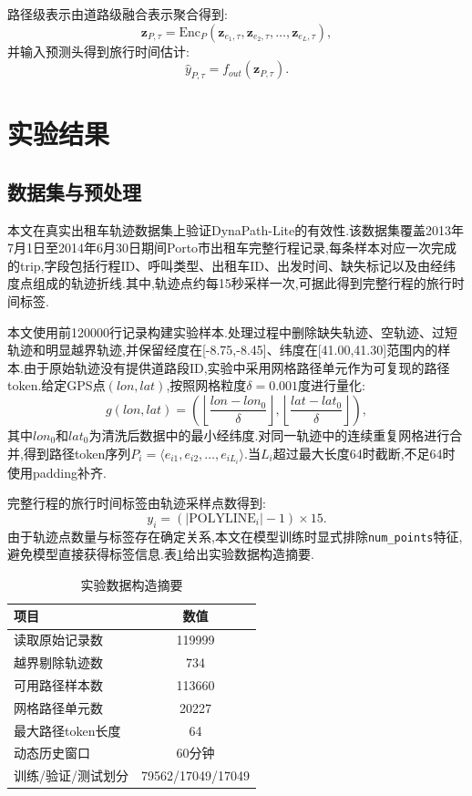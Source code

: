 \documentclass{rjthesis}
\begin{document}
路径级表示由道路级融合表示聚合得到:
\begin{equation}
	\mathbf{z}_{P,\tau}=\mathrm{Enc}_{P}\left(\mathbf{z}_{e_1,\tau},\mathbf{z}_{e_2,\tau},\ldots,\mathbf{z}_{e_L,\tau}\right),
\end{equation}
并输入预测头得到旅行时间估计:
\begin{equation}
	\hat{y}_{P,\tau}=f_{out}(\mathbf{z}_{P,\tau}).
\end{equation}

\section{实验结果}

\subsection{数据集与预处理}

本文在真实出租车轨迹数据集上验证DynaPath-Lite的有效性.该数据集覆盖2013年7月1日至2014年6月30日期间Porto市出租车完整行程记录\cite{pkdd2015porto},每条样本对应一次完成的trip,字段包括行程ID、呼叫类型、出租车ID、出发时间、缺失标记以及由经纬度点组成的轨迹折线.其中,轨迹点约每15秒采样一次,可据此得到完整行程的旅行时间标签.

本文使用前120000行记录构建实验样本.处理过程中删除缺失轨迹、空轨迹、过短轨迹和明显越界轨迹,并保留经度在[-8.75,-8.45]、纬度在[41.00,41.30]范围内的样本.由于原始轨迹没有提供道路段ID,实验中采用网格路径单元作为可复现的路径token.给定GPS点$(lon,lat)$,按照网格粒度$\delta=0.001$度进行量化:
\begin{equation}
	g(lon,lat)=\left(\left\lfloor\frac{lon-lon_0}{\delta}\right\rfloor,\left\lfloor\frac{lat-lat_0}{\delta}\right\rfloor\right),
\end{equation}
其中$lon_0$和$lat_0$为清洗后数据中的最小经纬度.对同一轨迹中的连续重复网格进行合并,得到路径token序列$P_i=\langle e_{i1},e_{i2},\ldots,e_{iL_i}\rangle$.当$L_i$超过最大长度64时截断,不足64时使用padding补齐.

完整行程的旅行时间标签由轨迹采样点数得到:
\begin{equation}
	y_i=(|\mathrm{POLYLINE}_i|-1)\times15.
\end{equation}
由于轨迹点数量与标签存在确定关系,本文在模型训练时显式排除\texttt{num\_points}特征,避免模型直接获得标签信息.表\ref{tab:data_summary}给出实验数据构造摘要.

\begin{table}[htbp]
	\centering
	\caption{实验数据构造摘要}
	\label{tab:data_summary}
	\begin{tabular}{lc}
		\toprule
		项目 & 数值 \\
		\midrule
		读取原始记录数 & 119999 \\
		越界剔除轨迹数 & 734 \\
		可用路径样本数 & 113660 \\
		网格路径单元数 & 20227 \\
		最大路径token长度 & 64 \\
		动态历史窗口 & 60分钟 \\
		训练/验证/测试划分 & 79562/17049/17049 \\
		\bottomrule
	\end{tabular}
\end{table}
\end{document}
